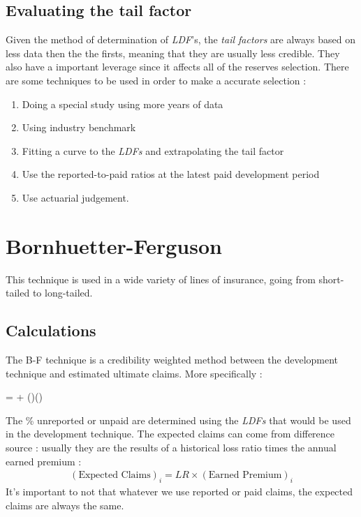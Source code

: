 \documentclass[11pt, english]{memoir}
\numberwithin{definition}{section}
\begin{document}
\section{Evaluating the tail factor}
Given the method of determination of \emph{LDF}'s, the \emph{tail factors} are always based on less data then the the firsts, meaning that they are usually less credible. They also have a important leverage since it affects all of the reserves selection. There are some techniques to be used in order to make a accurate selection : 
\begin{enumerate}
	\item Doing a special study using more years of data
	\item Using industry benchmark
	\item  Fitting a curve to the \emph{LDFs} and extrapolating the tail factor
	\item Use the reported-to-paid ratios at the latest paid development period
	\item Use actuarial judgement. 
\end{enumerate}







\chapter{Bornhuetter-Ferguson}

This technique is used in a wide variety of lines of insurance, going from short-tailed to long-tailed.

\section{Calculations}
The B-F technique is a credibility weighted method between the development technique and estimated ultimate claims. More specifically :
\begin{tcolorbox}
 =  + ()()
\end{tcolorbox}

The \% unreported or unpaid are determined using the \emph{LDFs} that would be used in the development technique. The expected claims can come from difference source : usually they are the results of a historical loss ratio times the annual earned premium : 
\begin{align*}
(\text{Expected Claims})_{i} = LR \times (\text{Earned Premium})_{i}
\end{align*}
It's important to not that whatever we use reported or paid claims, the expected claims are always the same. 
\end{document}
